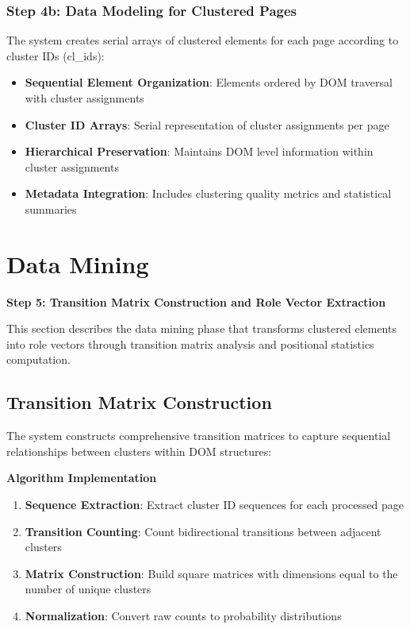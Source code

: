 \subsubsection{Step 4b: Data Modeling for Clustered Pages}
The system creates serial arrays of clustered elements for each page according to cluster IDs (cl_ids):

\begin{itemize}
    \item \textbf{Sequential Element Organization}: Elements ordered by DOM traversal with cluster assignments
    \item \textbf{Cluster ID Arrays}: Serial representation of cluster assignments per page
    \item \textbf{Hierarchical Preservation}: Maintains DOM level information within cluster assignments
    \item \textbf{Metadata Integration}: Includes clustering quality metrics and statistical summaries
\end{itemize}

\section{Data Mining}
\label{sec:data-mining}

\textbf{Step 5: Transition Matrix Construction and Role Vector Extraction}

This section describes the data mining phase that transforms clustered elements into role vectors through transition matrix analysis and positional statistics computation.

\subsection{Transition Matrix Construction}
\label{subsec:transition-matrix}

The system constructs comprehensive transition matrices to capture sequential relationships between clusters within DOM structures:

\textbf{Algorithm Implementation}
\begin{enumerate}
    \item \textbf{Sequence Extraction}: Extract cluster ID sequences for each processed page
    \item \textbf{Transition Counting}: Count bidirectional transitions between adjacent clusters
    \item \textbf{Matrix Construction}: Build square matrices with dimensions equal to the number of unique clusters
    \item \textbf{Normalization}: Convert raw counts to probability distributions
\end{enumerate}

